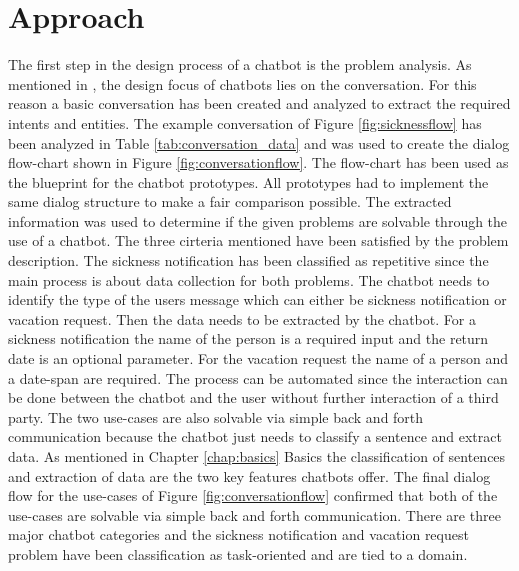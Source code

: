 \section{Approach}

The first step in the design process of a chatbot is the problem analysis.
As mentioned in \citet{folstad2017chatbots}, the design focus of 
chatbots lies on the conversation.
For this reason a basic conversation has been created and analyzed 
to extract the required intents and entities.
The example conversation of Figure \ref{fig:sicknessflow} has been 
analyzed in Table \ref{tab:conversation_data} and was used to create the dialog 
flow-chart shown in Figure \ref{fig:conversationflow}. 
The flow-chart has been used as the blueprint for the chatbot prototypes.
All prototypes had to implement the same dialog structure to make 
a fair comparison possible.
The extracted information was used to determine if the given problems are 
solvable through the use of a chatbot.
The three cirteria \citet{singhbuilding} mentioned have been satisfied by 
the problem description.
The sickness notification has been classified as repetitive since the main 
process is about data collection for both problems.
The chatbot needs to identify the type of the users message which can either be 
sickness notification or vacation request.
Then the data needs to be extracted by the chatbot.
For a sickness notification the name of the person is a required input and 
the return date is an optional parameter.
For the vacation request the name of a person and a date-span are required. 
The process can be automated since the interaction can be done between 
the chatbot and the user without further interaction of a third party.
The two use-cases are also solvable via simple back and forth communication 
because the chatbot just needs to classify a sentence and 
extract data. 
As mentioned in Chapter \ref{chap:basics} Basics the classification of sentences and extraction 
of data are the two key features chatbots offer.
The final dialog flow for the use-cases of Figure \ref{fig:conversationflow}
confirmed that both of the use-cases are solvable via simple back and forth 
communication.
There are three major chatbot categories and the sickness notification and 
vacation request problem have been classification as task-oriented and are 
tied to a domain.
